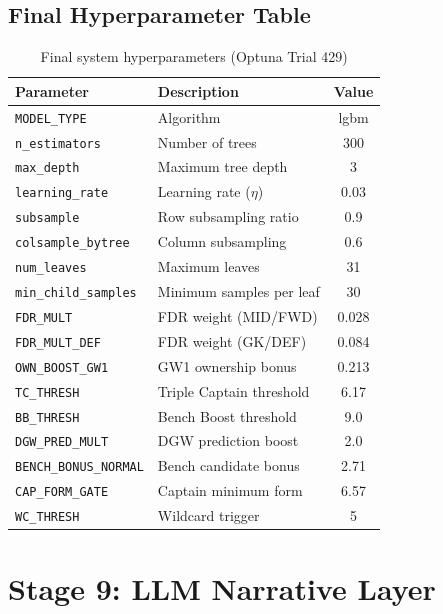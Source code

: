 \subsection{Final Hyperparameter Table}

\begin{table}[h]
\centering
\caption{Final system hyperparameters (Optuna Trial 429)}
\label{tab:hyperparams_en}
\begin{tabular}{llc}
\toprule
\textbf{Parameter} & \textbf{Description} & \textbf{Value} \\
\midrule
\texttt{MODEL\_TYPE}          & Algorithm               & lgbm   \\
\texttt{n\_estimators}        & Number of trees         & 300    \\
\texttt{max\_depth}           & Maximum tree depth      & 3      \\
\texttt{learning\_rate}       & Learning rate ($\eta$)  & 0.03   \\
\texttt{subsample}            & Row subsampling ratio   & 0.9    \\
\texttt{colsample\_bytree}    & Column subsampling      & 0.6    \\
\texttt{num\_leaves}          & Maximum leaves          & 31     \\
\texttt{min\_child\_samples}  & Minimum samples per leaf & 30    \\
\midrule
\texttt{FDR\_MULT}            & FDR weight (MID/FWD)    & 0.028  \\
\texttt{FDR\_MULT\_DEF}       & FDR weight (GK/DEF)     & 0.084  \\
\texttt{OWN\_BOOST\_GW1}      & GW1 ownership bonus     & 0.213  \\
\texttt{TC\_THRESH}           & Triple Captain threshold & 6.17  \\
\texttt{BB\_THRESH}           & Bench Boost threshold   & 9.0    \\
\texttt{DGW\_PRED\_MULT}      & DGW prediction boost    & 2.0    \\
\texttt{BENCH\_BONUS\_NORMAL} & Bench candidate bonus   & 2.71   \\
\texttt{CAP\_FORM\_GATE}      & Captain minimum form    & 6.57   \\
\texttt{WC\_THRESH}           & Wildcard trigger        & 5      \\
\bottomrule
\end{tabular}
\end{table}

\section{Stage 9: LLM Narrative Layer}

